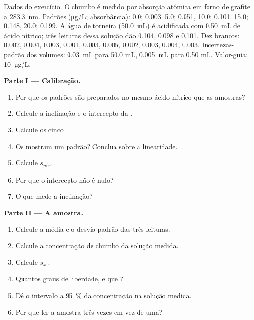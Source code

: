 \begin{problem}
\label{pb:b2:measurement-statistics:1}
Dados do exercício. O chumbo é medido por absorção atômica em forno de grafite a \qty{283.3}{nm}. Padrões
(\unit{\micro g/L}; absorbância): 0.0; 0.003, 5.0; 0.051, 10.0; 0.101, 15.0; 0.148, 20.0; 0.199. A
água de torneira (\qty{50.0}{mL}) é acidificada com \qty{0.50}{mL} de ácido nítrico; três leituras dessa
solução dão 0.104, 0.098 e 0.101. Dez brancos: 0.002, 0.004, 0.003, 0.001, 0.003, 0.005, 0.002,
0.003, 0.004, 0.003. Incertezas-padrão dos volumes: \qty{0.03}{mL} para 50.0 mL,
\qty{0.005}{mL} para 0.50 mL. Valor-guia: \qty{10}{\micro g/L}.

\medskip
\noindent\textbf{Parte I --- Calibração.}
\begin{enumerate}
  \item Por que os padrões são preparados no mesmo ácido nítrico que as amostras?
  \item Calcule a inclinação e o intercepto da .
  \item Calcule os cinco .
  \item Os  mostram um padrão? Conclua sobre a linearidade.
  \item Calcule $s_{y/x}$.
  \item Por que o intercepto não é nulo?
  \item O que mede a inclinação?
\end{enumerate}

\medskip
\noindent\textbf{Parte II --- A amostra.}
\begin{enumerate}[resume]
  \item Calcule a média e o desvio-padrão das três leituras.
  \item Calcule a concentração de chumbo da solução medida.
  \item Calcule $s_{x_0}$.
  \item Quantos graus de liberdade, e que ?
  \item Dê o intervalo a 95~\% da concentração na solução medida.
  \item Por que ler a amostra três vezes em vez de uma?
\end{enumerate}


\end{problem}
